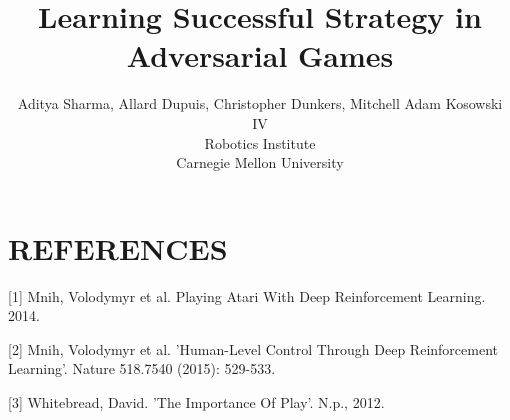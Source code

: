 \documentclass[10pt,twocolumn,letterpaper]{article}
\begin{document}
\title{Learning Successful Strategy in Adversarial Games }

\author{Aditya Sharma, Allard Dupuis, Christopher Dunkers, Mitchell Adam Kosowski IV\\
Robotics Institute\\
Carnegie Mellon University\\
}


\maketitle








\section{REFERENCES}
[1] Mnih, Volodymyr et al. Playing Atari With Deep Reinforcement Learning. 2014.

[2] Mnih, Volodymyr et al. 'Human-Level Control Through Deep Reinforcement Learning'. Nature 518.7540 (2015): 529-533.

[3] Whitebread, David. 'The Importance Of Play'. N.p., 2012.
  


	

%
	
	
\end{document}
